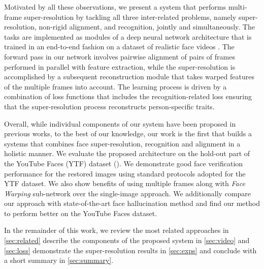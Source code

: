 Motivated by all these observations, we present a system that performs multi-frame super-resolution by tackling all three inter-related problems, namely super-resolution, non-rigid alignment, and recognition, jointly and simultaneously. The tasks are implemented as modules of a deep neural network architecture that is trained in an end-to-end fashion on a dataset of realistic face videos \cite{WolfHM11}. The forward pass in our network involves pairwise alignment of pairs of frames performed in parallel with feature extraction, while the super-resolution is accomplished by a subsequent reconstruction module that takes warped features of the multiple frames into account. The learning process is driven by a combination of loss functions that includes the recognition-related loss ensuring that the super-resolution process reconstructs person-specific traits. 




Overall, while individual components of our system have been proposed in previous works, to the best of our knowledge, our work is the first that builds a systems that combines face super-resolution, recognition and alignment in a holistic manner. 
We evaluate the proposed architecture on the hold-out part of the YouTube Faces (YTF) dataset (\cite{WolfHM11}). We demonstrate good face verification  performance for the restored images using standard protocols adopted for the YTF dataset. We also show benefits of using multiple frames along with \emph{Face Warping} sub-network over the single-image approach. 
 We additionally compare our approach with  state-of-the-art face hallucination method \cite{ZhuLLT16} and find our method to perform better on the YouTube Faces dataset.

In the remainder of this work, we review the most related approaches in \ref{sec:related} describe the components of the proposed system in \ref{sec:video} and \ref{sec:loss} demonstrate the super-resolution results in \ref{sec:exps} and conclude with a short summary in \ref{sec:summary}. 
